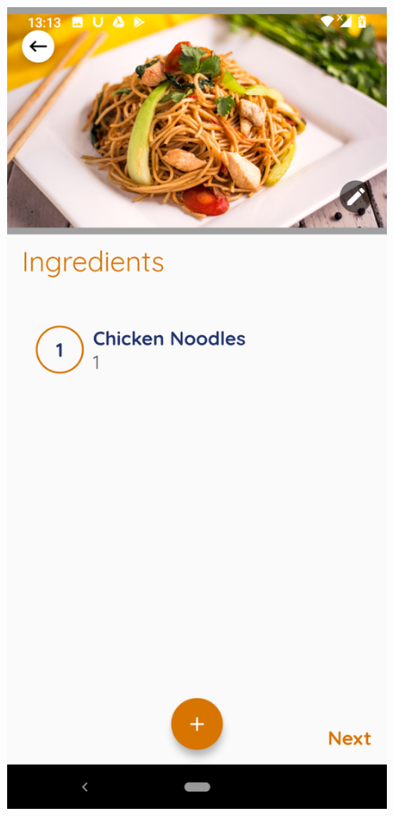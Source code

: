 \documentclass{article}
\begin{document}
        \begin{figure}[h!]
        \centering
        \includegraphics[scale=0.1]{Images/frienod_ingre.jpg}

\end{figure}
\end{document}
